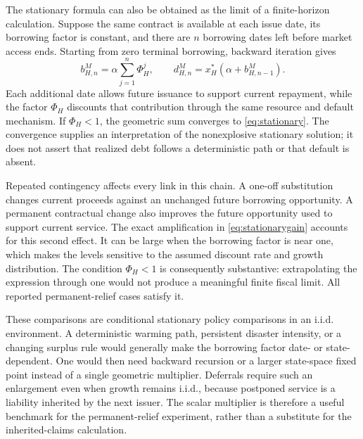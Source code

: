 The stationary formula can also be obtained as the limit of a finite-horizon calculation. Suppose the same contract is available at each issue date, its borrowing factor is constant, and there are $n$ borrowing dates left before market access ends. Starting from zero terminal borrowing, backward iteration gives
\begin{equation}\label{eq:finite_horizon_recursion}
 b_{H,n}^M=\alpha\sum_{j=1}^{n}\Phi_H^j,
 \qquad d_{H,n}^M=x_H^*(\alpha+b_{H,n-1}^M).
\end{equation}
Each additional date allows future issuance to support current repayment, while the factor $\Phi_H$ discounts that contribution through the same resource and default mechanism. If $\Phi_H<1$, the geometric sum converges to \eqref{eq:stationary}. The convergence supplies an interpretation of the nonexplosive stationary solution; it does not assert that realized debt follows a deterministic path or that default is absent.

Repeated contingency affects every link in this chain. A one-off substitution changes current proceeds against an unchanged future borrowing opportunity. A permanent contractual change also improves the future opportunity used to support current service. The exact amplification in \eqref{eq:stationarygain} accounts for this second effect. It can be large when the borrowing factor is near one, which makes the levels sensitive to the assumed discount rate and growth distribution. The condition $\Phi_H<1$ is consequently substantive: extrapolating the expression through one would not produce a meaningful finite fiscal limit. All reported permanent-relief cases satisfy it.

These comparisons are conditional stationary policy comparisons in an i.i.d. environment. A deterministic warming path, persistent disaster intensity, or a changing surplus rule would generally make the borrowing factor date- or state-dependent. One would then need backward recursion or a larger state-space fixed point instead of a single geometric multiplier. Deferrals require such an enlargement even when growth remains i.i.d., because postponed service is a liability inherited by the next issuer. The scalar multiplier is therefore a useful benchmark for the permanent-relief experiment, rather than a substitute for the inherited-claims calculation.

